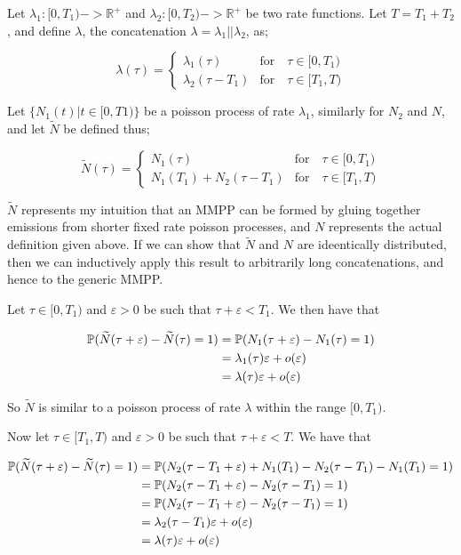 Let $\lambda_1: [0,T_1) -> \mathbb{R}^{+}$ and $\lambda_2:[0,T_2) -> \mathbb{R}^{+}$ be two rate functions. Let $T = T_1 + T_2$, and define $\lambda$, the concatenation $\lambda = \lambda_1 || \lambda_2$, as;

$$
\lambda(\tau) = 
\begin{cases}
	\lambda_1(\tau) & \mbox{for} \quad \tau \in [0,T_1)\\
	\lambda_2(\tau-T_1) & \mbox{for} \quad \tau \in [T_1,T)
\end{cases}
$$

Let $\{N_1(t) | t \in [0,T1)\}$ be a poisson process of rate $\lambda_1$, similarly for $N_2$ and $N$, and let $\widetilde{N}$ be defined thus;

$$
\widetilde{N}(\tau) = 
\begin{cases}
	N_1(\tau) & \mbox{for} \quad \tau \in [0,T_1)\\
	N_1(T_1) + N_2(\tau-T_1) & \mbox{for} \quad \tau \in [T_1,T)
\end{cases}
$$

$\widetilde{N}$ represents my intuition that an MMPP can be formed by gluing together emissions from shorter fixed rate poisson processes, and $N$ represents the actual definition given above. If we can show that $\widetilde{N}$ and $N$ are ideentically distributed, then we can inductively apply this result to arbitrarily long concatenations, and hence to the generic MMPP.

Let $\tau \in [0,T_1)$ and $\varepsilon>0$ be such that $\tau + \varepsilon < T_1$. We then have that

\begin{align*}
\mathbb{P} (\widetilde{N}(\tau+\varepsilon) - \widetilde{N}(\tau) = 1)
	&= \mathbb{P} (N_1(\tau+\varepsilon) - N_1(\tau) = 1) \\
	&= \lambda_1(\tau)\varepsilon + o(\varepsilon) \\
	&= \lambda(\tau)\varepsilon + o(\varepsilon)
\end{align*} 

So $\widetilde{N}$ is similar to a poisson process of rate $\lambda$ within the range $[0,T_1)$.

Now let $\tau \in [T_1,T)$ and $\varepsilon>0$ be such that $\tau + \varepsilon < T$. We have that

\begin{align*}
\mathbb{P} (\widetilde{N}(\tau+\varepsilon) - \widetilde{N}(\tau) = 1)
	&= \mathbb{P} (N_2(\tau-T_1+\varepsilon) + N_1(T_1) - N_2(\tau-T_1) - N_1(T_1)= 1)\\
	&= \mathbb{P} (N_2(\tau-T_1+\varepsilon) - N_2(\tau-T_1) = 1)\\
	&= \mathbb{P} (N_2(\tau-T_1+\varepsilon) - N_2(\tau-T_1) = 1)\\
	&= \lambda_2(\tau-T_1)\varepsilon + o(\varepsilon) \\
	&= \lambda(\tau)\varepsilon + o(\varepsilon)
\end{align*}

